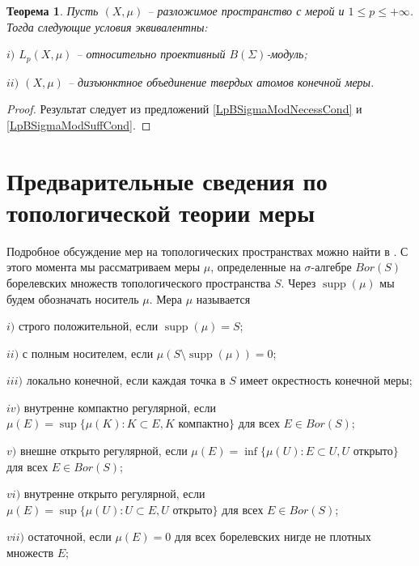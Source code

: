 \documentclass[12pt]{article}
\newtheorem{theorem}{Теорема}[section]
\begin{document}
\begin{theorem}\label{LpBSigmaModCrit} Пусть $(X,\mu)$ -- разложимое пространство с мерой и $1\leq p\leq +\infty$. Тогда следующие условия эквивалентны:

    $i)$ $L_p(X,\mu)$ -- относительно проективный $B(\Sigma)$-модуль;

    $ii)$ $(X,\mu)$ -- дизъюнктное объединение твердых атомов конечной меры.
\end{theorem}
\begin{proof} Результат следует из предложений \ref{LpBSigmaModNecessCond} и \ref{LpBSigmaModSuffCond}.
\end{proof}


\section{Предварительные сведения по топологической теории меры}
\label{SectionPreliminariesOnTopologicalMeasureTheory}

Подробное обсуждение мер на топологических пространствах можно найти в \cite{FremMeasTh4.1}. С этого момента мы рассматриваем меры $\mu$, определенные на $\sigma$-алгебре $Bor(S)$ борелевских множеств топологического пространства $S$. Через $\operatorname{supp}(\mu)$ мы будем обозначать носитель $\mu$. Мера $\mu$ называется

$i)$ строго положительной, если $\operatorname{supp}(\mu)=S$;

$ii)$ с полным носителем, если $\mu(S\setminus\operatorname{supp}(\mu))=0$;

$iii)$ локально конечной, если каждая точка в $S$ имеет окрестность конечной меры;

$iv)$ внутренне компактно регулярной, если $\mu(E)=\sup\{\mu(K): K\subset E, K\mbox{ компактно}\}$ для всех $E\in Bor(S)$;

$v)$ внешне открыто регулярной, если $\mu(E)=\inf\{\mu(U): E\subset U, U\mbox{ открыто}\}$ для всех $E\in Bor(S)$;

$vi)$ внутренне открыто регулярной, если $\mu(E)=\sup\{\mu(U): U\subset E, U\mbox{ открыто}\}$ для всех $E\in Bor(S)$;

$vii)$ остаточной, если $\mu(E)=0$ для всех борелевских нигде не плотных множеств $E$;
\end{document}
